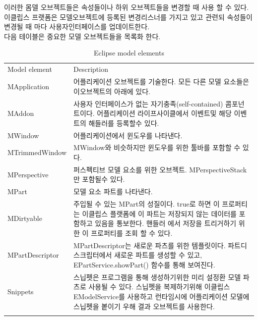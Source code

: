 이러한 몸델 오브젝트들은 속성들이나 하위 오브젝트들을 변경할 때 사용 할 수 있다. 이클립스 프랫폼은 모델오브젝트에 등록된 변경리스너를 가지고 있고 관련되 속성들이 변경될 때 마다 사용자인터페이스를 업데이트한다. \\

다음 테이블은 중요한 모델 오브젝트들을 목록화 한다. \\


\begin{table}
\caption{Eclipse model elements}
\label{tab:1}       %
%
%
\begin{tabular}{p{4cm}p{7.5cm}}
\hline\noalign{\smallskip}
Model element & Description \\
\noalign{\smallskip}\svhline\noalign{\smallskip}
MApplication & 어플리케이션 오브젝트를 기술한다. 모든 다른 모델 요소들은 이오브젝트의 아래에 있다. \\
\hline\noalign{\smallskip}
MAddon & 사용자 인터페이스가 없는 자기충족(self-contained) 콤포넌트이다. 어플리케이션 라이프사이클에서 이벤트및 해당 이벤트의 해들러를 등록할수 있다. \\
\hline\noalign{\smallskip}
MWindow & 어플리케이션에서 윈도우를 나타낸다. \\
\hline\noalign{\smallskip}
MTrimmedWindow & MWindow와 비슷하지만 윈도우를 위한 툴바를 포함할 수 있다. \\
\hline\noalign{\smallskip}
MPerspective & 퍼스펙티브 모델 요소를 위한 오브젝트. MPerspectiveStack만 포함될수 있다. \\
\hline\noalign{\smallskip}
MPart & 모델 요소 파트를 나타낸다. \\
\hline\noalign{\smallskip}
MDirtyable & 주입될 수 있는 MPart의 성질이다. true로 하면 이 프로퍼티는 이클립스 플랫폼에 이 파트는 저장되지 않는 데이터를 포함하고 있음을 통보한다. 핸들러 에서 저장을 트리거하기 위한 이 프로퍼티를 조회 할 수 있다. \\
\hline\noalign{\smallskip}
MPartDescriptor & MPartDescriptor는 새로운 파츠를 위한 템플릿이다. 파트디스크립터에서 새로운 파트를 생성할 수 있고, EPartService.showPart() 함수를 통해 보여진다. \\
\hline\noalign{\smallskip}
Snippets & 스닙펫은 프로그램을 통해 생성하기위한 미리 설정환 모델 파츠로 사용될 수 있다. 스닙펫을 복제하기위해 이클립스 EModelService를 사용하고 런타임시에 어플리케이션 모델에 스닙펫을 봍이기 우해 결과 오브젝트를 사용한다. \\
\noalign{\smallskip}\hline\noalign{\smallskip}
\end{tabular}
\end{table}

